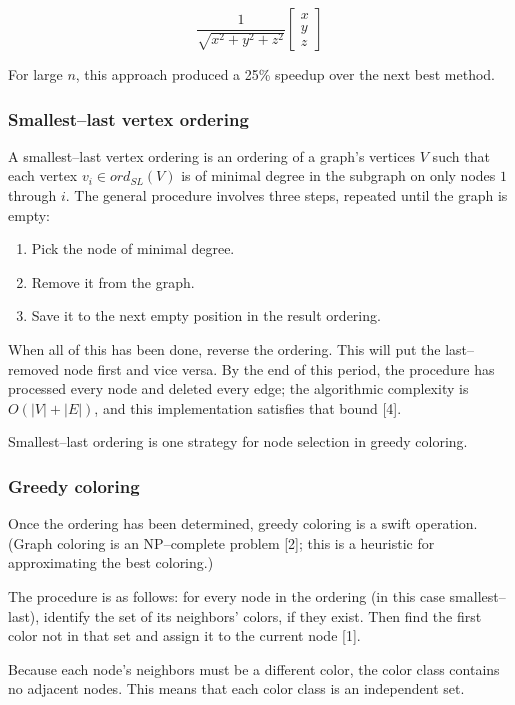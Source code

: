 \documentclass[oneside, titlepage]{scrartcl}
\begin{document}
\begin{equation}
\frac{1}{\sqrt{x^2 + y^2 + z^2}} \begin{bmatrix} x \\ y \\ z \end{bmatrix}
\end{equation}

For large $n$, this approach produced a 25\% speedup over the next best method.

\subsubsection{Smallest--last vertex ordering}

A smallest--last vertex ordering is an ordering of a graph's vertices $V$ such that each vertex $v_i \in ord_{SL}(V)$ is of minimal degree in the subgraph on only nodes $1$ through $i$. The general procedure involves three steps, repeated until the graph is empty:
\begin{enumerate}
\item
Pick the node of minimal degree.
\item
Remove it from the graph.
\item
Save it to the next empty position in the result ordering.
\end{enumerate}
When all of this has been done, reverse the ordering. This will put the last--removed node first and vice versa. By the end of this period, the procedure has processed every node and deleted every edge; the algorithmic complexity is $O(|V| + |E|)$, and this implementation satisfies that bound [4]. 

Smallest--last ordering is one strategy for node selection in greedy coloring. 

\subsubsection{Greedy coloring}

Once the ordering has been determined, greedy coloring is a swift operation. (Graph coloring is an NP--complete problem [2]; this is a heuristic for approximating the best coloring.) 

The procedure is as follows: for every node in the ordering (in this case smallest--last), identify the set of its neighbors' colors, if they exist. Then find the first color not in that set and assign it to the current node [1]. 

Because each node's neighbors must be a different color, the color class contains no adjacent nodes. This means that each color class is an independent set.
\end{document}
